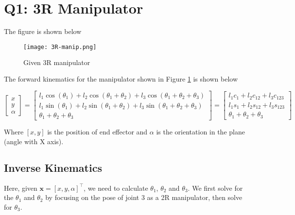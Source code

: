 
\section{Q1: 3R Manipulator}

The figure is shown below

\begin{figure}[h]
    \centering
    \texttt{[image: 3R-manip.png]}
    \caption{Given 3R manipulator}
    \label{fig:q1-3r-manipulator}
\end{figure}

The forward kinematics for the manipulator shown in Figure \ref{fig:q1-3r-manipulator} is shown below

\begin{equation}
    \begin{bmatrix}
        x \\ y \\ \alpha
        \end{bmatrix}  = \begin{bmatrix}
        l_1 \cos(\theta_1) + l_2 \cos(\theta_1 + \theta_2) + l_3 \cos(\theta_1 + \theta_2 + \theta_3) \\
        l_1 \sin(\theta_1) + l_2 \sin(\theta_1 + \theta_2) + l_3 \sin(\theta_1 + \theta_2 + \theta_3) \\
        \theta_1 + \theta_2 + \theta_3
        \end{bmatrix} = \begin{bmatrix}
        l_1 c_1 + l_2 c_{12} + l_3 c_{123} \\
        l_1 s_1 + l_2 s_{12} + l_3 s_{123} \\
        \theta_1 + \theta_2 + \theta_3
        \end{bmatrix}
\end{equation}

Where $[x, y]$ is the position of end effector and $\alpha$ is the orientation in the plane (angle with X axis).

\subsection{Inverse Kinematics}

Here, given $\mathbf{x} = [x, y, \alpha]^\top$, we need to calculate $\theta_1$, $\theta_2$ and $\theta_3$. We first solve for the $\theta_1$ and $\theta_2$ by focusing on the pose of joint 3 as a 2R manipulator, then solve for $\theta_3$.

